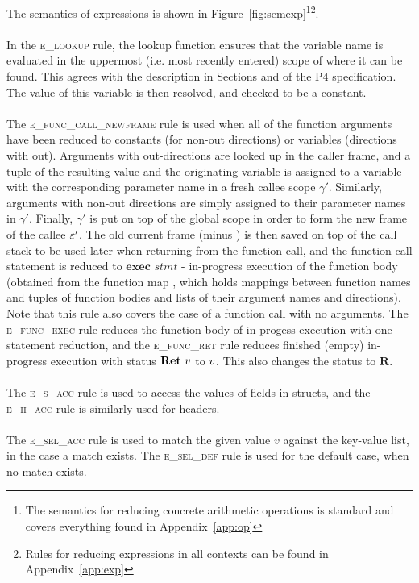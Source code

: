 \documentclass[UTF8]{article}
\begin{document}
The semantics of expressions is shown in Figure~\ref{fig:semexp}\footnote{The semantics for reducing concrete arithmetic operations is standard and covers everything found in Appendix~\ref{app:op}}\footnote{Rules for reducing expressions in all contexts can be found in Appendix~\ref{app:exp}}.
\\~\\
In the \textsc{e\_lookup} rule, the lookup function ensures that the variable name \vn{} is evaluated in the uppermost (i.e. most recently entered) scope of \currsf{} where it can be found. This agrees with the description in Sections  and  of the P4 specification. The value of this variable is then resolved, and checked to be a constant.
\\~\\
The \textsc{e\_func\_call\_newframe} rule is used when all of the function arguments have been reduced to constants (for non-out directions) or variables (directions with out). Arguments with out-directions are looked up in the caller frame, and a tuple of the resulting value and the originating variable is assigned to a variable with the corresponding parameter name in a fresh callee scope $\gamma'$. Similarly, arguments with non-out directions are simply assigned to their parameter names in $\gamma'$. Finally, $\gamma'$ is put on top of the global scope \gscope{} in order to form the new frame of the callee $\varepsilon '$. The old current frame \currsf{} (minus \gscope{}) is then saved on top of the call stack \cstack{} to be used later when returning from the function call, and the function call statement is reduced to $\mathbf{exec} \,\, \mathit{stmt}$ - in-progress execution of the function body \stmt{} (obtained from the function map \fmap{}, which holds mappings between function names \fn{} and tuples of function bodies and lists of their argument names and directions). Note that this rule also covers the case of a function call with no arguments. The \textsc{e\_func\_exec} rule reduces the function body of in-progess execution with one statement reduction, and the \textsc{e\_func\_ret} rule reduces finished (empty) in-progress execution with status $\mathbf{Ret} \,\, v$ to $v$. This also changes the status to $\mathbf{R}$.
\\~\\
The \textsc{e\_s\_acc} rule is used to access the values of fields in structs, and the \textsc{e\_h\_acc} rule is similarly used for headers.
\\~\\
The \textsc{e\_sel\_acc} rule is used to match the given value $v$ against the key-value list, in the case a match exists. The \textsc{e\_sel\_def} rule is used for the default case, when no match exists. 
\end{document}

